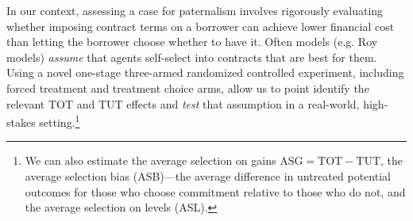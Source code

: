 \documentclass[12pt, a4paper]{article}
\begin{document}
In our context, assessing a case for paternalism involves rigorously evaluating whether imposing contract terms on a borrower can achieve lower financial cost than letting the borrower choose whether to have it. Often models (e.g. Roy models) \textit{assume} that agents self-select into contracts that are best for them. Using a novel one-stage three-armed randomized controlled experiment, including forced treatment and treatment choice arms, allow us to point identify the relevant TOT and TUT effects and \textit{test} that assumption in a real-world, high-stakes setting.\footnote{We can also estimate the average selection on gains $\text{ASG} = \text{TOT} - \text{TUT}$, the average selection bias (ASB)---the average difference in untreated potential outcomes for those who choose commitment relative to those who do not, and the average selection on levels (ASL).} 



\end{document}
